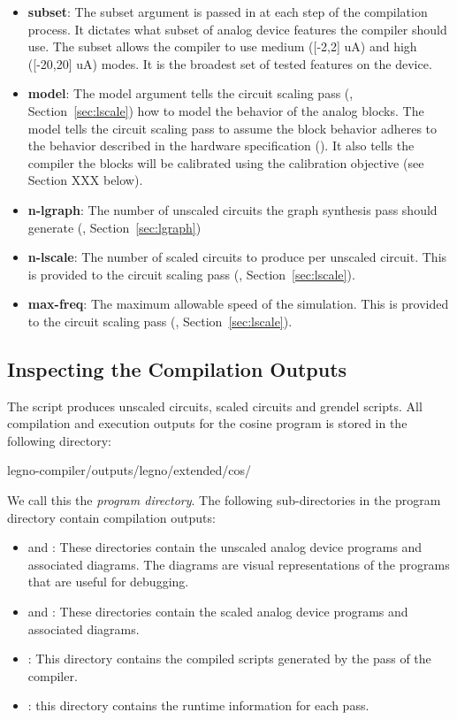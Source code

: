 \begin{itemize}
\item\textbf{subset}: The subset argument is passed in at each step of the
  compilation process. It dictates what subset of analog device features the
  compiler should use. The  subset allows the compiler to use
  medium ([-2,2] uA) and high ([-20,20] uA) modes. It is the broadest set of
  tested features on the device. 
\item\textbf{model}: The model argument tells the circuit scaling pass
  (, Section~\ref{sec:lscale}) how to model the behavior of the
  analog blocks. The  model tells the circuit scaling pass
  to assume the block behavior adheres to the behavior described in the
  hardware specification (). It also tells the compiler the blocks
  will be calibrated using the  calibration objective (see Section
  XXX below).
\item\textbf{n-lgraph}: The number of unscaled circuits the graph synthesis
  pass should generate (, Section~\ref{sec:lgraph})
\item\textbf{n-lscale}: The number of scaled circuits to produce per
  unscaled circuit. This is provided to the circuit scaling pass
  (, Section~\ref{sec:lscale}).
\item\textbf{max-freq}: The maximum allowable speed of the simulation.
  This is provided to the circuit scaling pass (, Section~\ref{sec:lscale}).
\end{itemize}


\subsection{Inspecting the Compilation Outputs}

The  script produces unscaled circuits, scaled circuits and
grendel scripts. All compilation and execution outputs for the cosine program is
stored in the following directory:

\begin{snippet}
  legno-compiler/outputs/legno/extended/cos/
\end{snippet}

We call this the \textit{program directory}. The following sub-directories in the
program directory contain compilation outputs:

\begin{itemize}
\item{} and : These directories contain the
  unscaled analog device programs and associated diagrams. The diagrams are visual
  representations of the programs that are useful for debugging.
\item{} and : These directories contain the
  scaled analog device programs and associated diagrams. 
\item {}: This directory contains the compiled  scripts
  generated by the  pass of the \legno compiler.
\item{}: this directory contains the runtime information for each
  pass.
\end{itemize}

